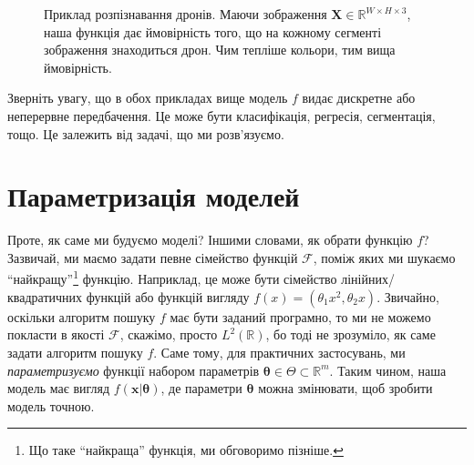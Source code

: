 \begin{example}
\begin{figure}
		\caption{Приклад розпізнавання дронів. Маючи зображення $\boldsymbol{X} \in \mathbb{R}^{W \times H \times 3}$, наша функція дає ймовірність того, що на кожному сегменті зображення знаходиться дрон. Чим тепліше кольори, тим вища ймовірність.}
		\label{fig:drone}
	\end{figure}
\end{example}

\begin{remark}
	Зверніть увагу, що в обох прикладах вище модель $f$ видає дискретне або
	неперервне передбачення. Це може бути класифікація, регресія, сегментація,
	тощо. Це залежить від задачі, що ми розв'язуємо.
\end{remark}

\section{Параметризація моделей}
Проте, як саме ми будуємо моделі? Іншими словами, як обрати функцію $f$?
Зазвичай, ми маємо задати певне сімейство функцій $\mathcal{F}$, поміж яких ми
шукаємо ``найкращу''\footnote{Що таке ``найкраща'' функція, ми обговоримо
пізніше.} функцію. Наприклад, це може бути сімейство лінійних/квадратичних
функцій або функцій вигляду $f(x) = (\theta_1x^2, \theta_2 x)$. Звичайно,
оскільки алгоритм пошуку $f$ має бути заданий програмно, то ми не можемо
покласти в якості $\mathcal{F}$, скажімо, просто $L^2(\mathbb{R})$, бо тоді не
зрозуміло, як саме задати алгоритм пошуку $f$. Саме тому, для практичних
застосувань, ми \textit{параметризуємо} функції набором параметрів
$\boldsymbol{\theta}\in \Theta \subset \mathbb{R}^m$. Таким чином, наша модель
має вигляд $f(\mathbf{x}|\boldsymbol{\theta})$, де параметри
$\boldsymbol{\theta}$ можна змінювати, щоб зробити модель точною.

